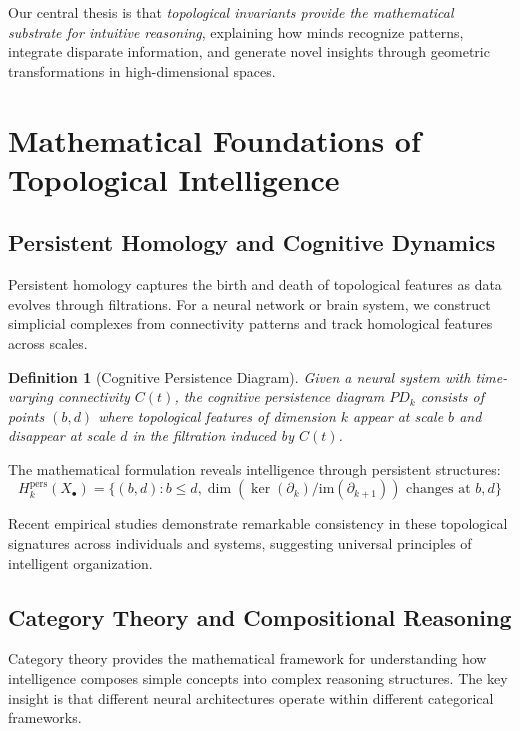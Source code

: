 \documentclass[11pt]{article}
\newtheorem{definition}[theorem]{Definition}
\begin{document}
Our central thesis is that \emph{topological invariants provide the mathematical substrate for intuitive reasoning}, explaining how minds recognize patterns, integrate disparate information, and generate novel insights through geometric transformations in high-dimensional spaces.

\section{Mathematical Foundations of Topological Intelligence}

\subsection{Persistent Homology and Cognitive Dynamics}

Persistent homology captures the birth and death of topological features as data evolves through filtrations. For a neural network or brain system, we construct simplicial complexes from connectivity patterns and track homological features across scales.

\begin{definition}[Cognitive Persistence Diagram]
Given a neural system with time-varying connectivity $C(t)$, the \emph{cognitive persistence diagram} $PD_k$ consists of points $(b,d)$ where topological features of dimension $k$ appear at scale $b$ and disappear at scale $d$ in the filtration induced by $C(t)$.
\end{definition}

The mathematical formulation reveals intelligence through persistent structures:
\[
H_k^{\text{pers}}(X_\bullet) = \{(b,d) : b \leq d, \dim(\ker(\partial_k)/\text{im}(\partial_{k+1})) \text{ changes at } b,d\}
\]

Recent empirical studies demonstrate remarkable consistency in these topological signatures across individuals and systems, suggesting universal principles of intelligent organization.

\subsection{Category Theory and Compositional Reasoning}

Category theory provides the mathematical framework for understanding how intelligence composes simple concepts into complex reasoning structures. The key insight is that different neural architectures operate within different categorical frameworks.
\end{document}
